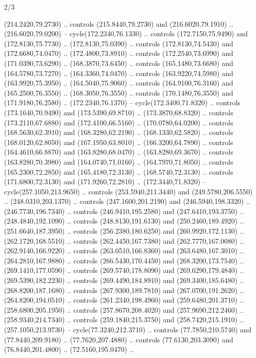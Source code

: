 \begin{flagdescription}{2/3}
\begin{scope}[xshift=0.5\flaglength,yshift=0.5\flagwidth,scale=\stretchfactor]
\begin{scope}[scale=0.001645\flagwidth,yshift=65mm,xshift=-63mm]
\begin{scope}[y=0.80pt, x=0.80pt, yscale=-1,]
\begin{scope}[cm={{1.33333,0.0,0.0,1.33333,(0.0,1e-05)}}]
  (214.2420,79.2730) .. controls (215.8440,79.2730) and (216.6020,79.1910) ..
  (216.6020,79.0200) -- cycle(172.2340,76.1330) .. controls (172.7150,75.9490)
  and (172.8130,75.7730) .. (172.8130,75.0390) .. controls (172.8130,74.5430)
  and (172.6680,74.0470) .. (172.4800,73.8910) .. controls (172.2540,73.6990)
  and (171.0390,73.6290) .. (168.3870,73.6450) .. controls (165.1480,73.6680)
  and (164.5780,73.7270) .. (164.3360,74.0470) .. controls (163.9220,74.5980)
  and (163.9920,75.3950) .. (164.5040,75.9060) .. controls (164.9100,76.3160)
  and (165.2500,76.3550) .. (168.3050,76.3550) .. controls (170.1480,76.3550)
  and (171.9180,76.2580) .. (172.2340,76.1370) -- cycle(172.3400,71.8320) ..
  controls (173.1640,70.9490) and (173.5390,69.8710) .. (173.3870,68.8320) ..
  controls (173.2110,67.6880) and (172.4100,66.5160) .. (170.0780,64.0200) ..
  controls (168.5630,62.3910) and (168.3280,62.2190) .. (168.1330,62.5820) ..
  controls (168.0120,62.8050) and (167.1950,63.8010) .. (166.3200,64.7890) ..
  controls (164.4610,66.8870) and (163.8280,68.0470) .. (163.8280,69.3670) ..
  controls (163.8280,70.3980) and (164.0740,71.0160) .. (164.7970,71.8050) ..
  controls (165.2300,72.2850) and (165.4180,72.3130) .. (168.5740,72.3130) ..
  controls (171.6800,72.3130) and (171.9260,72.2810) .. (172.3440,71.8320) --
  cycle(257.1050,213.9650) .. controls (253.5940,211.3440) and
  (249.5780,206.5550) .. (248.0310,203.1370) .. controls (247.1600,201.2190) and
  (246.5940,198.3320) .. (246.7730,196.7340) .. controls (246.9410,195.2580) and
  (247.6410,193.3750) .. (248.4840,192.1090) .. controls (248.8130,191.6130) and
  (250.2460,189.4920) .. (251.6640,187.3950) .. controls (256.2380,180.6250) and
  (260.9920,172.1130) .. (262.1720,168.5510) .. controls (262.4450,167.7380) and
  (262.7770,167.0080) .. (262.9140,166.9220) .. controls (263.0510,166.8360) and
  (263.6480,167.3010) .. (264.2810,167.9880) .. controls (266.5430,170.4450) and
  (268.3200,173.7540) .. (269.1410,177.0590) .. controls (269.5740,178.8090) and
  (269.6290,179.4840) .. (269.5390,182.2230) .. controls (269.4490,184.8910) and
  (269.3400,185.6480) .. (268.8200,187.1680) .. controls (267.9300,189.7810) and
  (267.0700,191.2620) .. (264.8200,194.0510) .. controls (261.2340,198.4960) and
  (259.6480,201.3710) .. (258.6800,205.1950) .. controls (257.8670,208.4020) and
  (257.9690,212.2460) .. (258.9340,214.7340) .. controls (259.1840,215.3750) and
  (258.7420,215.1910) .. (257.1050,213.9730) -- cycle(77.3240,212.3710) ..
  controls (77.7850,210.5740) and (77.8440,209.9180) .. (77.7620,207.4880) ..
  controls (77.6130,203.3090) and (76.8440,201.4800) .. (72.5160,195.0470) ..

\end{scope}
\end{scope}
\end{scope}
\end{scope}
\end{flagdescription}
